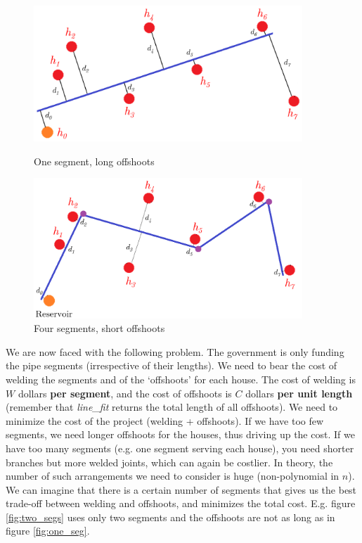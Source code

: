 \documentclass[addpoints]{exam}
\begin{document}
\begin{questions}
\begin{figure}[H]
    \setlength{\belowcaptionskip}{-10pt}
    \centering
    \begin{minipage}{0.45\textwidth}
        \includegraphics[width=0.9\textwidth]{one_seg.png}
        \caption{One segment, long offshoots}
        \label{fig:one_seg}
    \end{minipage}
    \begin{minipage}{0.45\textwidth}
        \centering
        \includegraphics[width=0.9\textwidth]{four_segs.png}
        \caption{Four segments, short offshoots}
        \label{fig:four_segs}
    \end{minipage}
\end{figure}
\vspace{0.1\textheight}
We are now faced with the following problem. The government is only funding the pipe segments (irrespective of their lengths). We need to bear the cost of welding the segments and of the `offshoots' for each house. The cost of welding is $W$ dollars \textbf{per segment}, and the cost of offshoots is $C$ dollars \textbf{per unit length} (remember that \textit{line\_fit} returns the total length of all offshoots). We need to minimize the cost of the project (welding + offshoots). If we have too few segments, we need longer offshoots for the houses, thus driving up the cost. If we have too many segments (e.g. one segment serving each house), you need shorter branches but more welded joints, which can again be costlier. In theory, the number of such arrangements we need to consider is huge (non-polynomial in $n$). We can imagine that there is a certain number of segments that gives us the best trade-off between welding and offshoots, and minimizes the total cost. E.g. figure \ref{fig:two_segs} uses only two segments and the offshoots are not as long as in figure \ref{fig:one_seg}.


\end{questions}
\end{document}
